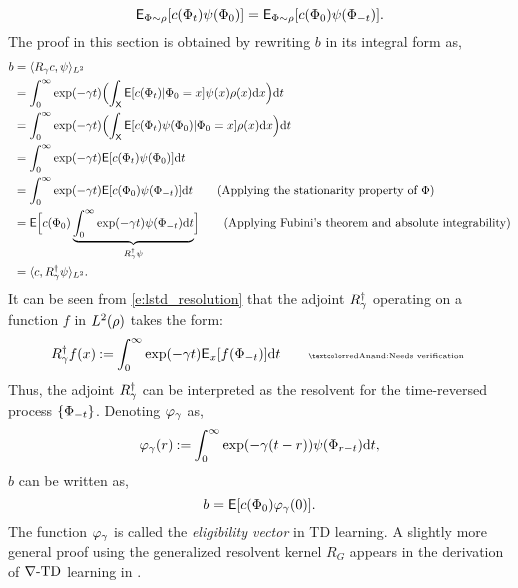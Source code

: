 \begin{equation}
{\sf E}_{\Phi \sim \rho}[c(\Phi_t) \psi(\Phi_0)] = {\sf E}_{\Phi \sim \rho} [c(\Phi_0) \psi(\Phi_{-t})].
\end{equation} 
The proof in this section is obtained by rewriting $b$ in its integral form as,
\begin{equation}
\begin{aligned}
b & = \langle R_\discount c, \basis \rangle_{L^2} \\
& = \int_0^\infty \exp(-\discount t)  \Bigl(\int_{\state} \Expect[c(\markovstate_t)| \markovstate_0 = x] \basis(x)  \pr(x) \ud x \Bigr) \ud t \\
& = \int_0^\infty \exp(-\discount t)  \Bigl(\int_{\state} \Expect[c(\markovstate_t) \basis(\markovstate_0)| \markovstate_0 = x]  \pr(x) \ud x \Bigr) \ud t \\
& = \int_0^\infty \exp(-\discount t) \Expect[c(\markovstate_t) \basis(\markovstate_0)]\ud t \\
& = \int_0^\infty \exp(-\discount t) \Expect[c(\markovstate_0) \basis(\markovstate_{-t})] \ud t \qquad \text{(Applying the stationarity property of $\markovstate$)}\\
& = \Expect\Bigl[c(\markovstate_0) \underbrace{\int_0^\infty \exp(-\discount t) \basis(\markovstate_{-t})\ud t}_{R^\dagger_\discount \basis}\Bigr]  \qquad \text{(Applying Fubini's theorem and absolute integrability)}\\
& = \langle c, R^\dagger_\discount \basis \rangle_{L^2}.
\label{e:lstd_resolution}
\end{aligned}
\end{equation}
It can be seen from \eqref{e:lstd_resolution} that the adjoint $R^\dagger_\gamma$ operating on a function $f$ in $L^2(\rho)$ takes the form:
\begin{equation}
R^\dagger_\discount f(x) \eqdef \int_0^\infty \exp(-\discount t ) \Expect_x[f(\markovstate_{-t})] \ud t \qquad \text{\anand{Needs verification}}
\end{equation}
Thus, the adjoint $R^\dagger_\gamma$ can be interpreted as the resolvent for the time-reversed process $\{\Phi_{-t}\}$. 
Denoting $\varphi_\gamma$ as,
\begin{equation}
\eligibvector_\discount(r) \eqdef \int_0^\infty \exp(-\discount (t -r)) \basis(\markovstate_{r-t}) \ud t,
\label{e:lstd_eligib}
\end{equation}
$b$ can be written as,
\begin{equation}
b = \Expect[c(\markovstate_0) \eligibvector_\discount(0)].
\label{e:lstd_b}
\end{equation}
The function $\varphi_\gamma$ is called the \textit{eligibility vector} in TD learning. A slightly more general proof using the generalized resolvent kernel $R_G$ appears in the derivation of $\nabla\text{-TD}$ learning in .

